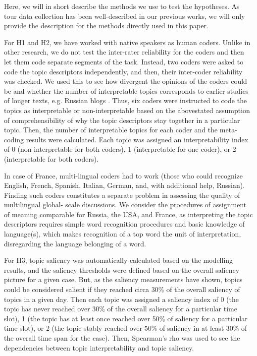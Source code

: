 Here, we will in short describe the methods we use to test the hypotheses. As tour data collection has been well-described in our previous works, we will only provide the description for the methods directly used in this paper.

For H1 and H2, we have worked with native speakers as human coders. Unlike in other research, we do not test the inter-rater reliability for the coders and then let them code separate segments of the task. Instead, two coders were asked to code the topic descriptors independently, and then, their inter-coder reliability was checked. We used this to see how divergent the opinions of the coders could be and whether the number of interpretable topics corresponds to earlier studies of longer texts, e.g. Russian blogs \cite{KoltsovaKoltcov}. Thus, six coders were instructed to code the topics as interpretable or non-interpretable based on the abovestated assumption of comprehensibility of why the topic descriptors stay together in a particular topic. Then, the number of interpretable topics for each coder and the meta-coding results were calculated. Each topic was assigned an interpretability index of 0 (non-interpretable for both coders), 1 (interpretable for one coder), or 2 (interpretable for both coders).

In case of France, multi-lingual coders had to work (those who could recognize English, French, Spanish, Italian, German, and, with additional help, Russian). Finding such coders constitutes a separate problem in assessing the quality of multilingual global- scale discussions. We consider the procedures of assignment of meaning comparable for Russia, the USA, and France, as interpreting the topic descriptors requires simple word recognition procedures and basic knowledge of language(s), which makes recognition of a top word the unit of interpretation, disregarding the language belonging of a word.

For H3, topic saliency was automatically calculated based on the modelling results, and the saliency thresholds were defined based on the overall saliency picture for a given case. But, as the saliency measurements have shown, topics could be considered salient if they reached circa 30\% of the overall saliency of topics in a given day. Then each topic was assigned a saliency index of 0 (the topic has never reached over 30\% of the overall saliency for a particular time slot), 1 (the topic has at least once reached over 50\% of saliency for a particular time slot), or 2 (the topic stably reached over 50\% of saliency in at least 30\% of the overall time span for the case). Then, Spearman’s rho was used to see the dependencies between topic interpretability and topic saliency.


